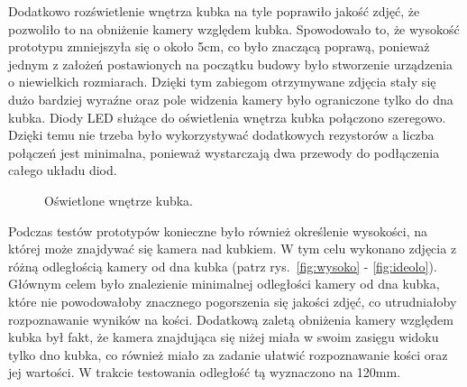 Dodatkowo rozświetlenie wnętrza kubka na tyle poprawiło
jakość zdjęć, że pozwoliło to na obniżenie kamery względem kubka. Spowodowało to, że wysokość prototypu zmniejszyła się o około 5cm, 
co było znaczącą poprawą, ponieważ jednym z założeń postawionych na początku budowy było stworzenie urządzenia o niewielkich rozmiarach.
Dzięki tym zabiegom otrzymywane zdjęcia stały się dużo bardziej wyraźne oraz pole widzenia kamery było ograniczone tylko do dna kubka.
Diody LED służące do oświetlenia wnętrza kubka połączono szeregowo. Dzięki temu nie trzeba było wykorzystywać dodatkowych rezystorów a liczba połączeń
jest minimalna, ponieważ wystarczają dwa przewody do podłączenia całego układu diod.

\begin{figure}[H]
    \centering
    \caption{\label{fig:jasno}Oświetlone wnętrze kubka.}
\end{figure}

Podczas testów prototypów konieczne było również określenie wysokości, na której może znajdywać się kamera nad kubkiem. 
W tym celu wykonano zdjęcia z różną odległością kamery od dna kubka (patrz rys.~\ref{fig:wysoko} - \ref{fig:ideolo}). Głównym celem było znalezienie minimalnej odległości kamery od dna kubka, które nie powodowałoby 
znacznego pogorszenia się jakości zdjęć, co utrudniałoby rozpoznawanie wyników na kości. Dodatkową zaletą obniżenia kamery względem kubka był fakt, że kamera
znajdująca się niżej miała w swoim zasięgu widoku tylko dno kubka, co również miało za zadanie ułatwić rozpoznawanie kości oraz jej wartości. W trakcie testowania
odległość tą wyznaczono na 120mm.

